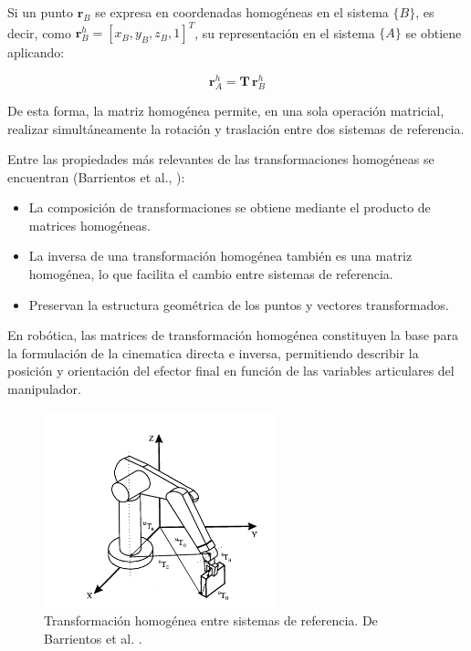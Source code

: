 \documentclass[12pt,a4paper,oneside]{report}
\begin{document}
Si un punto $\mathbf{r}_B$ se expresa en coordenadas homogéneas en el sistema
$\{B\}$, es decir, como $\mathbf{r}_B^h = [x_B, y_B, z_B, 1]^T$, su
representación en el sistema $\{A\}$ se obtiene aplicando:

\begin{equation}
\mathbf{r}_A^h = \mathbf{T} \, \mathbf{r}_B^h
\label{eq:transformacion_homogenea_aplicacion}
\end{equation}

De esta forma, la matriz homogénea permite, en una sola operación matricial,
realizar simultáneamente la rotación y traslación entre dos sistemas de
referencia.  

Entre las propiedades más relevantes de las transformaciones homogéneas se
encuentran (Barrientos et al., \cite{barrientos2014}):
\begin{itemize}
    \item La composición de transformaciones se obtiene mediante el producto
    de matrices homogéneas.
    \item La inversa de una transformación homogénea también es una matriz
    homogénea, lo que facilita el cambio entre sistemas de referencia.
    \item Preservan la estructura geométrica de los puntos y vectores
    transformados.
\end{itemize}

En robótica, las matrices de transformación homogénea constituyen la base para
la formulación de la \gls{cinematica} directa e inversa, permitiendo describir la
posición y orientación del efector final en función de las variables articulares
del manipulador.

\begin{figure}[h]
\centering
\includegraphics[width=0.6\textwidth]{figuras/homogeneas.png}
\caption{Transformación homogénea entre sistemas de referencia. De Barrientos et al. \cite{barrientos2014}.}
\label{fig:Transformacion_homogenea}  
\end{figure}
\end{document}
